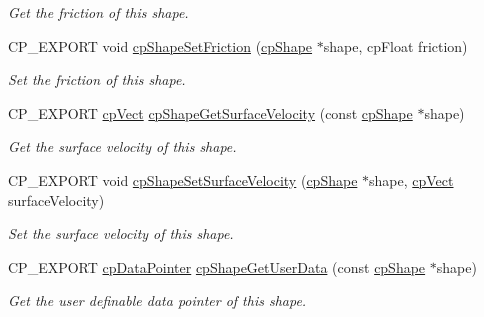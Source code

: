 \begin{DoxyCompactItemize}
\begin{DoxyCompactList}\small\item\em Get the friction of this shape. \end{DoxyCompactList}\item 
\mbox{\label{group__cpShape_ga2ffe1f94c19a1b248e7784216862add9}} 
C\+P\+\_\+\+E\+X\+P\+O\+RT void \hyperlink{group__cpShape_ga2ffe1f94c19a1b248e7784216862add9}{cp\+Shape\+Set\+Friction} (\hyperlink{structcpShape}{cp\+Shape} $\ast$shape, cp\+Float friction)
\begin{DoxyCompactList}\small\item\em Set the friction of this shape. \end{DoxyCompactList}\item 
\mbox{\label{group__cpShape_gaa353b1aa872bad9549d45c05bcdb4722}} 
C\+P\+\_\+\+E\+X\+P\+O\+RT \hyperlink{structcpVect}{cp\+Vect} \hyperlink{group__cpShape_gaa353b1aa872bad9549d45c05bcdb4722}{cp\+Shape\+Get\+Surface\+Velocity} (const \hyperlink{structcpShape}{cp\+Shape} $\ast$shape)
\begin{DoxyCompactList}\small\item\em Get the surface velocity of this shape. \end{DoxyCompactList}\item 
\mbox{\label{group__cpShape_ga6300af79e7bf2427e8142eb5e15ad394}} 
C\+P\+\_\+\+E\+X\+P\+O\+RT void \hyperlink{group__cpShape_ga6300af79e7bf2427e8142eb5e15ad394}{cp\+Shape\+Set\+Surface\+Velocity} (\hyperlink{structcpShape}{cp\+Shape} $\ast$shape, \hyperlink{structcpVect}{cp\+Vect} surface\+Velocity)
\begin{DoxyCompactList}\small\item\em Set the surface velocity of this shape. \end{DoxyCompactList}\item 
\mbox{\label{group__cpShape_gab8e58cc69432190ffb0f00cb0f0dc400}} 
C\+P\+\_\+\+E\+X\+P\+O\+RT \hyperlink{group__basicTypes_ga2ac2c3c31e21893941f9e4f8ee279447}{cp\+Data\+Pointer} \hyperlink{group__cpShape_gab8e58cc69432190ffb0f00cb0f0dc400}{cp\+Shape\+Get\+User\+Data} (const \hyperlink{structcpShape}{cp\+Shape} $\ast$shape)
\begin{DoxyCompactList}\small\item\em Get the user definable data pointer of this shape. \end{DoxyCompactList}\item 

\end{DoxyCompactItemize}
